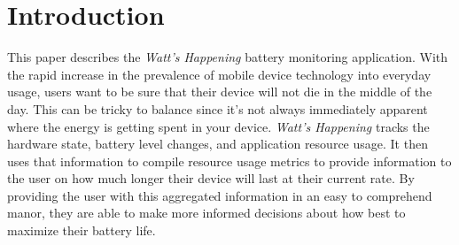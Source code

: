 \section*{Introduction}
\label{sec:intro}
This paper describes the \emph{Watt's Happening} battery monitoring application. 
With the rapid increase in the prevalence of mobile device technology into everyday usage, users want to be sure that their device will not die in the middle of the day.
This can be tricky to balance since it's not always immediately apparent where the energy is getting spent in your device.
\emph{Watt's Happening} tracks the hardware state, battery level changes, and application resource usage. 
It then uses that information to compile resource usage metrics to provide information to the user on how much longer their device will last at their current rate.
By providing the user with this aggregated information in an easy to comprehend manor, they are able to make more informed decisions about how best to maximize their battery life.
